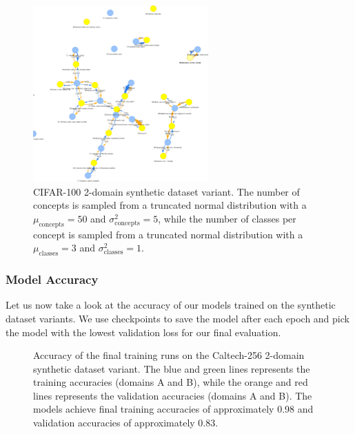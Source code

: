 \begin{figure}[ht]
      \centering
      \includegraphics[width=0.6\textwidth]{figures/cifar100_2domain.png}
      \caption{CIFAR-100 2-domain synthetic dataset variant.
      The number of concepts is sampled from a truncated normal distribution
      with a $\mu_{\text{concepts}}=50$ and $\sigma^2_{\text{concepts}}=5$,
      while the number of classes per concept is sampled from a truncated normal distribution
      with a $\mu_{\text{classes}}=3$ and $\sigma^2_{\text{classes}}=1$.}
      \label{fig:cifar100_2domain}
\end{figure}

\subsubsection{Model Accuracy}

Let us now take a look at the accuracy of our models trained on the synthetic dataset variants.
We use checkpoints to save the model after each epoch and pick the model with the lowest validation loss
for our final evaluation.


\begin{figure}[ht]
      \centering
      \scalebox{0.6}{}
      \caption{Accuracy of the final training runs on the Caltech-256 2-domain synthetic dataset variant.
            The blue and green lines represents the training accuracies (domains A and B),
            while the orange and red lines represents the validation accuracies (domains A and B).
            The models achieve final training accuracies of approximately 0.98 and validation accuracies of approximately 0.83.}
      \label{fig:caltech256_2domain_accuracy}
\end{figure}

